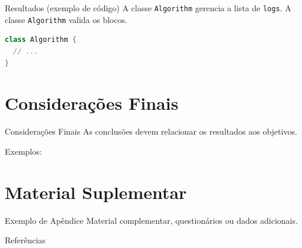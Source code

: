 \documentclass[aspectratio=169]{beamer}
\newcommand{\code}[1]{\texttt{#1}}
\begin{document}
\begin{frame}[fragile]{Resultados (exemplo de código)}
A classe \code{Algorithm} gerencia a lista de \code{logs}.  
A classe \lstinline!Algorithm! valida os blocos.
\begin{lstlisting}[language=Java, caption={Exemplo de classe}, label={lst:ex}]
class Algorithm {
  // ...
}
\end{lstlisting}
\end{frame}

\section{Considerações Finais}

\begin{frame}{Considerações Finais}
As conclusões devem relacionar os resultados aos objetivos.

Exemplos:
\end{frame}

\appendix
\renewcommand{\thesection}{Apêndice \Alph{section}}

\section{Material Suplementar}

\begin{frame}{Exemplo de Apêndice}\label{sec:apendiceA}
Material complementar, questionários ou dados adicionais.
\end{frame}

\begin{frame}[allowframebreaks]{Referências}
\printbibliography[heading=none]
\end{frame}
\end{document}
